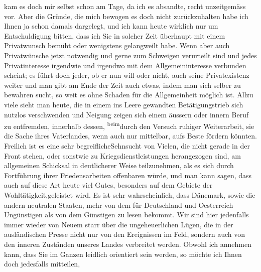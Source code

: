 \begin{ledgroupsized}[t]{13cm}
               kam es doch mir selbst schon am Tage, da ich es absandte, recht unzeitgemäss vor.
               Aber die Gründe, die mich bewogen es doch nicht zurückzuhalten habe ich Ihnen ja  schon damals dargelegt\introOben{},\introOben{}
               und ich kann heute wirklich nur um Entschuldigung bitten, dass ich Sie in solcher
               Zeit überhaupt mit einem Privatwunsch bemüht oder wenigstens gelangweilt habe. Wenn
               aber auch Privatwünsche jetzt notwendig und gerne zum Schweigen verurteilt sind und
               jedes Privatinteresse irgendwie und irgendwo mit dem Allgemeininteresse verbunden
               scheint; es führt {\pb}doch jeder, ob er nun will oder
               nicht, auch seine Privatexistenz weiter und man gibt am Ende der Zeit auch etwas,
               indem man sich selber zu bewahren sucht, so weit es ohne Schaden für die
               Allgemeinheit möglich ist. Allzu viele sieht man heute, die in einem ins Leere
               gewandten Betätigungstrieb sich nutzlos verschwenden und Neigung zeigen sich einem
               äussern oder innern Beruf zu entfremden, innerhalb dessen, \substVorne{}\textsuperscript{beim}\substDazwischen{}durch den\substHinten{} Versuch ruhiger Weiterarbeit, sie die Sache ihres Vaterlandes, wenn auch nur
               mittelbar, aufs Beste fördern könnten. Freilich ist \introOben{}es eine sehr
                  begreifliche\introOben{}Sehnsucht von Vielen, die nicht gerade in der Front
               stehen, oder sonstwie zu Kriegsdienstleistungen herangezogen sind, am allgemeinen
               Schicksal in deutlicherer Weise teilzunehmen, als es sich durch Fortführung ihrer
               Friedensarbeiten offenbaren würde, und man kann sagen, dass auch auf diese Art heute
               viel Gutes, besonders auf dem Gebiete der Wohltätigkeit,geleistet wird.\pend
           \pstart
           Es ist sehr wahrscheinlich, dass {\pb}Dänemark, sowie die andern neutralen Staaten,
               mehr von dem für Deutschland und Oesterreich Ungünstigen als von dem Günstigen zu
               lesen bekommt. Wir sind hier jedenfalls immer wieder von Neuem starr über die
               ungeheuerlichen Lügen, die in der ausländischen Presse nicht nur von den Ereignissen
               im Feld, sondern auch von den inneren Zuständen unseres Landes verbreitet werden.
               Obwohl ich annehmen kann, dass Sie im Ganzen \label{LL710-1v}\label{LL710-1h}leidlich orientiert sein werden, so möchte ich Ihnen doch jedesfalls mitteilen,

\end{ledgroupsized}
